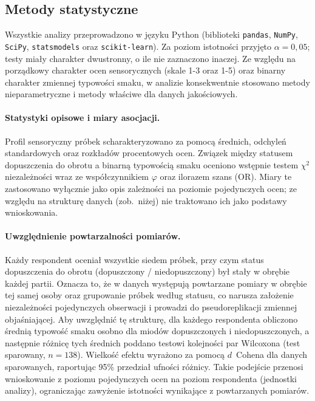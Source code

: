 

\subsection{Metody statystyczne}

Wszystkie analizy przeprowadzono w języku Python (biblioteki
\texttt{pandas}, \texttt{NumPy}, \texttt{SciPy}, \texttt{statsmodels}
oraz \texttt{scikit-learn}). Za poziom istotności przyjęto
$\alpha = 0{,}05$; testy miały charakter dwustronny, o ile nie
zaznaczono inaczej. Ze względu na porządkowy charakter ocen sensorycznych
(skale 1-3 oraz 1-5) oraz binarny charakter zmiennej typowości
smaku, w analizie konsekwentnie stosowano metody nieparametryczne
i metody właściwe dla danych jakościowych.

\paragraph{Statystyki opisowe i miary asocjacji.}
Profil sensoryczny próbek scharakteryzowano za pomocą średnich,
odchyleń standardowych oraz rozkładów procentowych ocen. Związek między
statusem dopuszczenia do obrotu a binarną typowością smaku oceniono
wstępnie testem $\chi^2$ niezależności wraz ze współczynnikiem $\varphi$
oraz ilorazem szans (OR). Miary te zastosowano wyłącznie jako opis
zależności na poziomie pojedynczych ocen; ze względu na strukturę danych
(zob.\ niżej) nie traktowano ich jako podstawy wnioskowania.


\paragraph{Uwzględnienie powtarzalności pomiarów.}
Każdy respondent oceniał wszystkie siedem próbek, przy czym status
dopuszczenia do obrotu (dopuszczony / niedopuszczony) był stały
w obrębie każdej partii. Oznacza to, że w danych występują powtarzane
pomiary w obrębie tej samej osoby oraz grupowanie próbek według statusu,
co narusza założenie niezależności pojedynczych obserwacji i prowadzi
do pseudoreplikacji zmiennej objaśniającej. Aby uwzględnić tę strukturę,
dla każdego respondenta obliczono średnią typowość smaku osobno dla miodów
dopuszczonych i niedopuszczonych, a następnie różnicę tych średnich
poddano testowi kolejności par Wilcoxona (test sparowany, $n = 138$).
Wielkość efektu wyrażono za pomocą $d$~Cohena dla danych sparowanych,
raportując 95\% przedział ufności różnicy. Takie podejście przenosi
wnioskowanie z poziomu pojedynczych ocen na poziom respondenta
(jednostki analizy), ograniczając zawyżenie istotności wynikające
z powtarzanych pomiarów.

